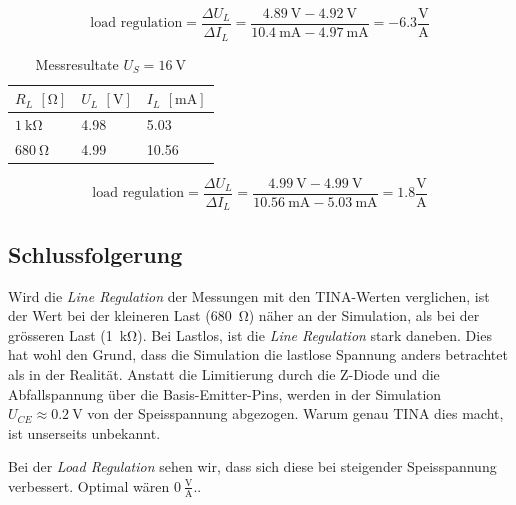 \documentclass[../main.tex]{subfiles}
\begin{document}
\begin{equation}
    \text{load regulation} = \frac{\Delta U_{L}}{\Delta I_{L}} = \frac{\SI{4.89}{\volt}-\SI{4.92}{\volt}}{\SI{10.4}{\milli\ampere} - \SI{4.97}{\milli\ampere}} = -6.3 \frac{\si{\volt}}{\si{\ampere}}
    \label{equ:task2_load_reg_10V}
\end{equation}

\begin{table}[h]
\renewcommand{\arraystretch}{1.3}
\centering
\begin{tabular}{l|ll}
\textbf{$R_L$} $[\si{\ohm}]$ & \textbf{$U_L$} $[\si{\volt}]$ & \textbf{$I_L$} $[\si{\milli\ampere}]$ \\ \hline
\textbf{$\SI{1}{\kilo\ohm}$}    & 4.98  & 5.03    \\
\textbf{$\SI{680}{\ohm}$}       & 4.99  & 10.56  
\end{tabular}
\caption{Messresultate $U_S = \SI{16}{\volt}$}
\label{tab:result_task2_load_reg_16V}
\end{table}

\begin{equation}
    \text{load regulation} = \frac{\Delta U_{L}}{\Delta I_{L}} = \frac{\SI{4.99}{\volt}-\SI{4.99}{\volt}}{\SI{10.56}{\milli\ampere} - \SI{5.03}{\milli\ampere}} = 1.8 \frac{\si{\volt}}{\si{\ampere}}
    \label{equ:task2_load_reg_16V}
\end{equation}

\subsection{Schlussfolgerung}

Wird die \textit{Line Regulation} der Messungen mit den TINA-Werten verglichen, ist der Wert bei der kleineren Last (\SI{680}{\ohm}) näher an der Simulation, als bei der grösseren Last (\SI{1}{\kilo\ohm}). Bei Lastlos, ist die \textit{Line Regulation} stark daneben. Dies hat wohl den Grund, dass die Simulation die lastlose Spannung anders betrachtet als in der Realität. Anstatt die Limitierung durch die Z-Diode und die Abfallspannung über die Basis-Emitter-Pins, werden in der Simulation $U_{CE} \approx \SI{0.2}{\volt}$ von der Speisspannung abgezogen. Warum genau TINA dies macht, ist unserseits unbekannt.

Bei der \textit{Load Regulation} sehen wir, dass sich diese bei steigender Speisspannung verbessert. Optimal wären $\SI{0}{\frac{\si{\volt}}{\si{\ampere}}}$..
\end{document}
